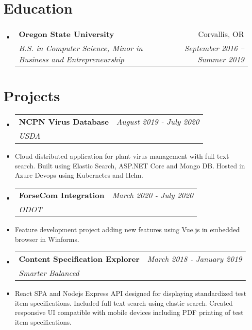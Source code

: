 \documentclass[letterpaper,11pt]{article}
\makeatletter
\newcommand{\resumeSubheading}[4]{
  \vspace{-1pt}\item
    \begin{tabular*}{0.97\textwidth}{l@{\extracolsep{\fill}}r}
      \textbf{\Large#1} & #2 \\
      \textit{\small#3} & \textit{\small #4} \\
    \end{tabular*}\vspace{-5pt}
}
\newcommand{\resumeSubHeadingListStart}{\begin{itemize}[label={},leftmargin=*]}
\newcommand{\resumeSubHeadingListEnd}{\end{itemize}}
\makeatother
\begin{document}
\section{Education}
  \resumeSubHeadingListStart
    \resumeSubheading
      {Oregon State University}{Corvallis, OR}
      {B.S. in Computer Science, Minor in Business and Entrepreneurship}{September 2016 -- Summer 2019}
  \resumeSubHeadingListEnd

\section{Projects}
  \resumeSubHeadingListStart
    \resumeSubheading
    {NCPN Virus Database}{\textit{August 2019 - July 2020 }}
    {USDA}{}
        \item{Cloud distributed application for plant virus management with full text search. Built using Elastic Search, ASP.NET Core and Mongo DB. Hosted in Azure Devops using Kubernetes and Helm.}\newline \hfill
        
    \resumeSubheading
    {ForseCom Integration}{ \textit{March 2020 - July 2020}}
    {ODOT}{}
        \item{Feature development project adding new features using Vue.js in embedded browser in Winforms.} \newline \hfill
    \resumeSubheading
        {Content Specification Explorer}{\textit{March 2018 - January 2019}}
    {Smarter Balanced}{}
        \item{React SPA and Nodejs Express API designed for displaying standardized test item specifications. Included full text search using elastic search. Created responsive UI compatible with mobile devices including PDF printing of test item specifications.} \newline \hfill
        

  \resumeSubHeadingListEnd
\end{document}
